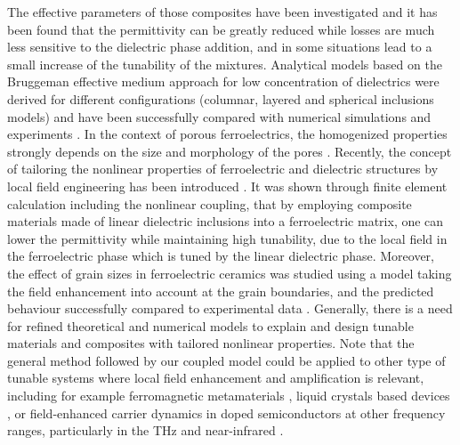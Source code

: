 \documentclass[%
 aip,
 amsmath,amssymb,
 reprint,%
linenumbers
]{revtex4-1}
\newcommand{\co}[1]{\textcolor{correction}{#1}}
\begin{document}
The effective parameters of those composites have been investigated
\cite{sherman_ferroelectric-dielectric_2006, jylha_tunability_2008, sherman_tunability_2004, astafiev_can_2003}
and it has been found that the permittivity can be greatly reduced while losses are much less
 sensitive to the dielectric phase addition, and in some situations lead to a small
  increase of the tunability of the mixtures. Analytical models based on the Bruggeman effective
medium approach for low concentration of dielectrics were derived for different configurations (columnar, layered and spherical
inclusions models) and have been successfully compared with numerical simulations and experiments \cite{sherman_ferroelectric-dielectric_2006}.
  In the context of porous ferroelectrics,
   the homogenized properties strongly depends on the size and morphology of the pores
    \cite{okazaki_effects_1973,stanculescu_study_2015}.
    Recently, the concept of tailoring the nonlinear properties of ferroelectric
     and dielectric structures by local field engineering has been introduced \cite{padurariu_tailoring_2012,padurariu_field-dependent_2012,cazacu_tunable_2013}.
      It was shown through finite element calculation including the nonlinear coupling, that by employing
      composite materials made of linear dielectric inclusions into a ferroelectric matrix, one can lower the permittivity while maintaining
      high tunability, due to the local field in the ferroelectric phase which is tuned by the linear dielectric phase.
Moreover, the effect of grain sizes in ferroelectric
ceramics was studied using a model taking the field enhancement into account at
the grain boundaries, and the predicted behaviour successfully compared to experimental data \cite{padurariu_field-dependent_2012}.
Generally, there is a need for refined theoretical and numerical models to explain and design
tunable materials and composites with tailored nonlinear properties.
\co{Note that the general method followed by our coupled model could be applied to other type of tunable
systems where local field enhancement and amplification is relevant, including for example ferromagnetic metamaterials \cite{carignan_ferromagnetic_2011}, liquid crystals based devices \cite{werner_liquid_2007}, or field-enhanced carrier dynamics in doped semiconductors at other frequency ranges, particularly in the THz and near-infrared
\cite{keiser_terahertz_2019, fan_nonlinear_2013}.
}
\end{document}
